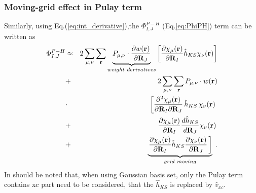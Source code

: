 \documentclass[journal=jpca,manuscript=article]{achemso}
\renewcommand{\vec}[1]{{\bf #1}}
\begin{document}
\subsubsection{Moving-grid effect in Pulay term } 
Similarly, using Eq.(\ref{eq:int_derivative}),the $\Phi_{I,J}^{P-H}$ (Eq.\ref{eq:PhiPH}) term can be
written as
\begin{eqnarray}
\Phi_{I,J}^{P-H} & \approx &  
2 \sum_{\mu,\nu} \sum_{\mathbf{r}} 
 \underbrace{P_{\mu,\nu}\cdot     \dfrac{\partial w(\mathbf{r})}{\partial  \mathbf{R}_{J} }  }_{weight \ derivatives }
\left[\dfrac{\partial \chi_{\mu}(\mathbf{r})}{\partial  \mathbf{R}_{I} }\hat{h}_{KS} \chi_{\nu}(\mathbf{r}) \right]
 \nonumber \\
&+&2\sum_{\mu,\nu} \sum_{\mathbf{r}} 
P_{\mu,\nu} \cdot w(\mathbf{r}) \nonumber \\ 
&\cdot&\left[
 \dfrac{\partial^2 \chi_{\mu }(\mathbf{r})}{\partial  \mathbf{R}_{I}\partial  \mathbf{R}_{J} }\,\hat{h}_{KS}\, \chi_{\nu}(\mathbf{r}) \, \right. \nonumber \\
&+&  \dfrac{\partial \chi_{\mu}(\mathbf{r})}{\partial  \mathbf{R}_{I} }\frac{d \hat{h}_{KS}}{d\vec{R}_{J}}\chi_{\nu}(\mathbf{r}) \,  \nonumber \\
&+&\underbrace{\left.  \dfrac{\partial \chi_{\mu}(\mathbf{r})}{\partial  \mathbf{R}_{I} }\hat{h}_{KS}\frac{\partial \chi_{\nu}(\mathbf{r})}{\partial \vec{R}_{J}} \,
\right] }_{grid\ moving}\;.  
\label{eq:PhiPH_moving}
\end{eqnarray}
In should be noted that, when using Gaussian basis set\cite{Johnson1993a,Baker1994,Malagoli2003},
only the Pulay term contains xc part need to be
considered, that the $\hat{h}_{KS}$ is replaced by $\hat{v}_{xc}$.
\end{document}

